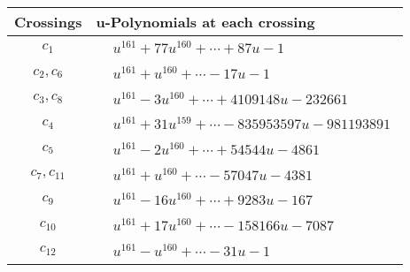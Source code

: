 \documentclass[1p]{elsarticle_modified}
\theoremstyle{definition}
\begin{document}
\begin{tabular}{m{50pt}|m{274pt}}
Crossings & \hspace{64pt}u-Polynomials at each crossing \\
\hline $$\begin{aligned}c_{1}\end{aligned}$$&$\begin{aligned}
&u^{161}+77 u^{160}+\cdots+87 u-1
\end{aligned}$\\
\hline $$\begin{aligned}c_{2},c_{6}\end{aligned}$$&$\begin{aligned}
&u^{161}+u^{160}+\cdots-17 u-1
\end{aligned}$\\
\hline $$\begin{aligned}c_{3},c_{8}\end{aligned}$$&$\begin{aligned}
&u^{161}-3 u^{160}+\cdots+4109148 u-232661
\end{aligned}$\\
\hline $$\begin{aligned}c_{4}\end{aligned}$$&$\begin{aligned}
&u^{161}+31 u^{159}+\cdots-835953597 u-981193891
\end{aligned}$\\
\hline $$\begin{aligned}c_{5}\end{aligned}$$&$\begin{aligned}
&u^{161}-2 u^{160}+\cdots+54544 u-4861
\end{aligned}$\\
\hline $$\begin{aligned}c_{7},c_{11}\end{aligned}$$&$\begin{aligned}
&u^{161}+u^{160}+\cdots-57047 u-4381
\end{aligned}$\\
\hline $$\begin{aligned}c_{9}\end{aligned}$$&$\begin{aligned}
&u^{161}-16 u^{160}+\cdots+9283 u-167
\end{aligned}$\\
\hline $$\begin{aligned}c_{10}\end{aligned}$$&$\begin{aligned}
&u^{161}+17 u^{160}+\cdots-158166 u-7087
\end{aligned}$\\
\hline $$\begin{aligned}c_{12}\end{aligned}$$&$\begin{aligned}
&u^{161}- u^{160}+\cdots-31 u-1
\end{aligned}$\\
\hline
\end{tabular}\\~\\
\end{document}
